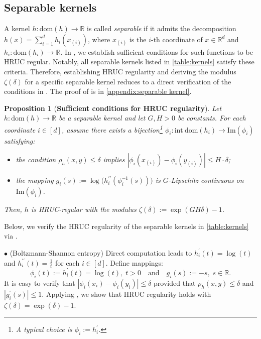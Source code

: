 \documentclass{article}
\theoremstyle{plain}
\newtheorem{proposition}[theorem]{Proposition}
\theoremstyle{definition}
\theoremstyle{remark}
\newcommand{\R}{\mathbb{R}}
\newcommand{\Rd}{\mathbb{R}^d}
\newcommand{\sG}{G}
\newcommand{\sH}{H}
\newcommand{\dom}[1]{\mathrm{dom}(#1)}
\newcommand{\idom}[1]{\mathrm{int\ dom}(#1)}
\begin{document}
\subsection{Separable kernels}\label{subsec:separable kernel}
A kernel $h:\dom{h}\to\R$ is called \emph{separable} if it admits the decomposition $h(x)=\sum_{i=1}^d h_i(x_{(i)})$, where $x_{(i)}$ is the $i$-th coordinate of $x\in\Rd$ and $h_i:\dom{h_i}\to\R$. In , we establish sufficient conditions for such functions to be HRUC regular. Notably, all separable kernels listed in \cref{table:kernels} satisfy these criteria. Therefore, establishing HRUC regularity and deriving the modulus $\zeta(\delta)$ for a specific separable kernel reduces to a direct verification of the conditions in . The proof of  is in \cref{appendix:separable kernel}. 
\begin{proposition}[\textbf{Sufficient conditions for HRUC regularity}]\label{lem:verify kernels}
    Let $h:\dom{h}\to\R$ be a separable kernel and let $\sG, \sH > 0$ be constants. For each coordinate $i\in[d]$, assume there exists a bijection\footnote{A typical choice is $\phi_i:=h_i^\prime$.} $\phi_i:\idom{h_i}\to\mathrm{Im}(\phi_i)$ satisfying:%
       \begin{itemize}
        \item the condition $\rho_h(x,y)\leq \delta$ implies $|\phi_i(x_{(i)})-\phi_i(y_{(i)})|\leq \sH\cdot  \delta$; %
        \item the mapping $g_i(s):=\log\big(h_i^{\prime\prime}(\phi_i^{-1}(s))\big)$ is $\sG$-Lipschitz continuous on $\mathrm{Im}(\phi_i)$.
    \end{itemize} 
    Then, $h$ is HRUC-regular with the modulus $\zeta(\delta):=\exp(\sG\sH  \delta)-1$. 
\end{proposition}
Below, we verify the HRUC regularity of the separable kernels in \cref{table:kernels} via .
\smallskip

\noindent $\bullet$ {(Boltzmann-Shannon entropy)} %
Direct computation leads to $h_i^\prime(t)=\log(t)$ and $h_i^{\prime\prime}(t)=\frac{1}{t}$ for each $i\in[d]$.  Define mappings: \[\phi_i(t):=h_i^\prime(t)=\log(t),\;t>0 \quad \text{and} \quad g_i(s):=-s,\; s\in\R. \]
It is easy to verify that $|\phi_i(x_i)-\phi_i(y_i)|\leq\delta$ provided that $\rho_h(x,y)\leq \delta$ and $|g_i^\prime(s)| \leq 1$. Applying , we show that HRUC regularity holds with $\zeta(\delta) = \exp(\delta) -1$.\par\smallskip
\end{document}
